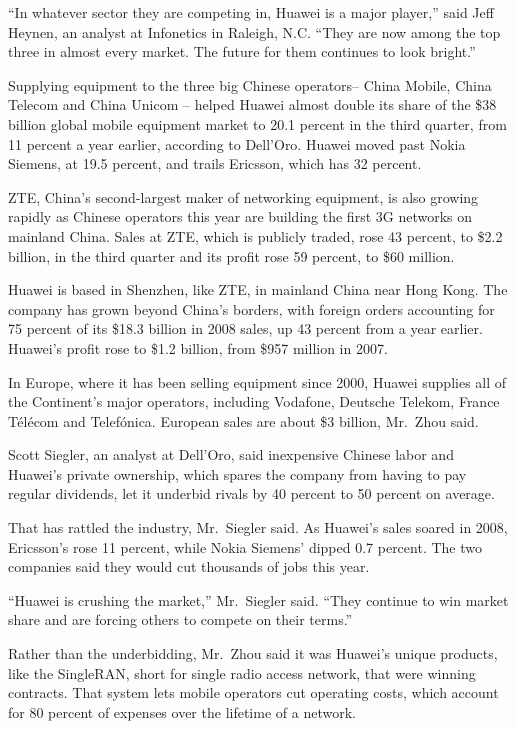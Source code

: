 ﻿\documentclass[12pt]{article}
\begin{document}
``In whatever sector they are competing in, Huawei is a major player,'' said Jeff Heynen, an analyst
at Infonetics in Raleigh, N.C. ``They are now among the top three in almost every market. The future
for them continues to look bright.''

Supplying equipment to the three big Chinese operators-- China Mobile, China Telecom and China
Unicom -- helped Huawei almost double its share of the \$38 billion global mobile equipment market
to 20.1 percent in the third quarter, from 11 percent a year earlier, according to Dell'Oro. Huawei
moved past Nokia Siemens, at 19.5 percent, and trails Ericsson, which has 32 percent.

ZTE, China's second-largest maker of networking equipment, is also growing rapidly as Chinese
operators this year are building the first 3G networks on mainland China. Sales at ZTE, which is
publicly traded, rose 43 percent, to \$2.2 billion, in the third quarter and its profit rose 59
percent, to \$60 million.

Huawei is based in Shenzhen, like ZTE, in mainland China near Hong Kong. The company has grown
beyond China's borders, with foreign orders accounting for 75 percent of its \$18.3 billion in 2008
sales, up 43 percent from a year earlier. Huawei's profit rose to \$1.2 billion, from \$957 million
in 2007.

In Europe, where it has been selling equipment since 2000, Huawei supplies all of the Continent's
major operators, including Vodafone, Deutsche Telekom, France T\'el\'ecom and Telef\'onica. European
sales are about \$3 billion, Mr.~Zhou said.

Scott Siegler, an analyst at Dell'Oro, said inexpensive Chinese labor and Huawei's private
ownership, which spares the company from having to pay regular dividends, let it underbid rivals by
40 percent to 50 percent on average.

That has rattled the industry, Mr.~Siegler said. As Huawei's sales soared in 2008, Ericsson's rose
11 percent, while Nokia Siemens' dipped 0.7 percent. The two companies said they would cut thousands
of jobs this year.

``Huawei is crushing the market,'' Mr.~Siegler said. ``They continue to win market share and are
forcing others to compete on their terms.''

Rather than the underbidding, Mr.~Zhou said it was Huawei's unique products, like the SingleRAN,
short for single radio access network, that were winning contracts. That system lets mobile
operators cut operating costs, which account for 80 percent of expenses over the lifetime of a
network.
\end{document}
